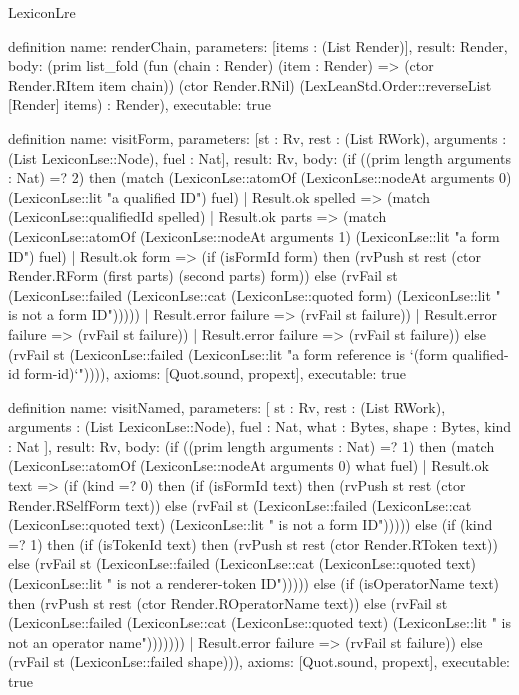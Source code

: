 \begin{lexlean}{LexiconLre}
\begin{semanticmodule}
definition{
  name: renderChain,
  parameters: [items : (List Render)],
  result: Render,
  body: (prim list_fold (fun (chain : Render) (item : Render) => (ctor Render.RItem item chain)) (ctor Render.RNil) (LexLeanStd.Order::reverseList [Render] items) : Render),
  executable: true
}

definition{
  name: visitForm,
  parameters: [st : Rv, rest : (List RWork), arguments : (List LexiconLse::Node), fuel : Nat],
  result: Rv,
  body: (if ((prim length arguments : Nat) =? 2) then (match (LexiconLse::atomOf (LexiconLse::nodeAt arguments 0) (LexiconLse::lit "a qualified ID") fuel)
    | Result.ok spelled => (match (LexiconLse::qualifiedId spelled)
      | Result.ok parts => (match (LexiconLse::atomOf (LexiconLse::nodeAt arguments 1) (LexiconLse::lit "a form ID") fuel)
        | Result.ok form => (if (isFormId form) then (rvPush st rest (ctor Render.RForm (first parts) (second parts) form)) else (rvFail st (LexiconLse::failed (LexiconLse::cat (LexiconLse::quoted form) (LexiconLse::lit " is not a form ID")))))
        | Result.error failure => (rvFail st failure))
      | Result.error failure => (rvFail st failure))
    | Result.error failure => (rvFail st failure)) else (rvFail st (LexiconLse::failed (LexiconLse::lit "a form reference is `(form qualified-id form-id)`")))),
  axioms: [Quot.sound, propext],
  executable: true
}

definition{
  name: visitNamed,
  parameters: [
    st : Rv,
    rest : (List RWork),
    arguments : (List LexiconLse::Node),
    fuel : Nat,
    what : Bytes,
    shape : Bytes,
    kind : Nat
  ],
  result: Rv,
  body: (if ((prim length arguments : Nat) =? 1) then (match (LexiconLse::atomOf (LexiconLse::nodeAt arguments 0) what fuel)
    | Result.ok text => (if (kind =? 0) then (if (isFormId text) then (rvPush st rest (ctor Render.RSelfForm text)) else (rvFail st (LexiconLse::failed (LexiconLse::cat (LexiconLse::quoted text) (LexiconLse::lit " is not a form ID"))))) else (if (kind =? 1) then (if (isTokenId text) then (rvPush st rest (ctor Render.RToken text)) else (rvFail st (LexiconLse::failed (LexiconLse::cat (LexiconLse::quoted text) (LexiconLse::lit " is not a renderer-token ID"))))) else (if (isOperatorName text) then (rvPush st rest (ctor Render.ROperatorName text)) else (rvFail st (LexiconLse::failed (LexiconLse::cat (LexiconLse::quoted text) (LexiconLse::lit " is not an operator name")))))))
    | Result.error failure => (rvFail st failure)) else (rvFail st (LexiconLse::failed shape))),
  axioms: [Quot.sound, propext],
  executable: true
}


\end{semanticmodule}
\end{lexlean}

